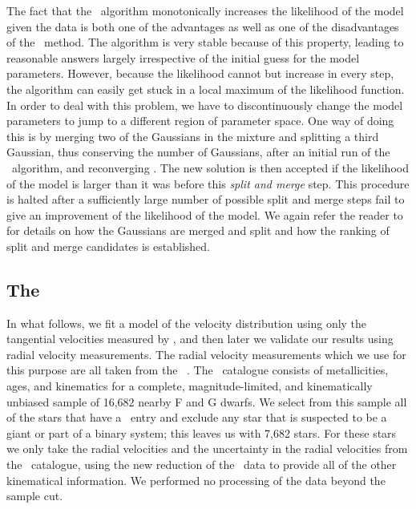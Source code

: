 The fact that the \EM\ algorithm monotonically increases the
likelihood of the model given the data is both one of the advantages
as well as one of the disadvantages of the \EM\ method. The algorithm
is very stable because of this property, leading to reasonable answers
largely irrespective of the initial guess for the model
parameters. However, because the likelihood cannot but increase in
every step, the algorithm can easily get stuck in a local maximum of
the likelihood function. In order to deal with this problem, we have
to discontinuously change the model parameters to jump to a different
region of parameter space. One way of doing this is by merging two of
the Gaussians in the mixture and splitting a third Gaussian, thus
conserving the number of Gaussians, after an initial run of the \EM\
algorithm, and reconverging \citep{Naonori1998}. The new solution is
then accepted if the likelihood of the model is larger than it was
before this \emph{split and merge} step. This procedure is halted
after a sufficiently large number of possible split and merge steps
fail to give an improvement of the likelihood of the model. We again
refer the reader to \citet{BovyXD} for details on how the Gaussians
are merged and split and how the ranking of split and merge candidates
is established.



\subsection{The \gcs}\label{sec:gcs}

In what follows, we fit a model of the velocity distribution using
only the tangential velocities measured by \Hipparcos, and then later
we validate our results using radial velocity measurements. The radial
velocity measurements which we use for this purpose are all taken from
the \gcs\ \citep[\gcsabb;][]{2004A&A...418..989N}. The \gcsabb\
catalogue consists of metallicities, ages, and kinematics for a
complete, magnitude-limited, and kinematically unbiased sample of
16,682 nearby F and G dwarfs. We select from this sample all of the
stars that have a \Hipparcos\ entry and exclude any star that is
suspected to be a giant or part of a binary system; this leaves us
with 7,682 stars. For these stars we only take the radial velocities
and the uncertainty in the radial velocities from the \gcsabb\
catalogue, using the new reduction of the \Hipparcos\ data to provide
all of the other kinematical information. We performed no processing
of the data beyond the sample cut.



